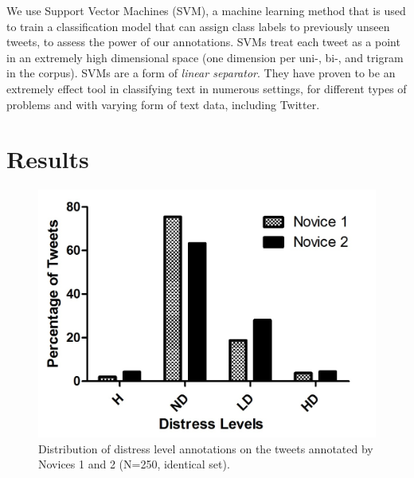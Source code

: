 \documentclass[11pt]{article}
\begin{document}
We use Support Vector Machines (SVM), a machine learning method that is used to train a classification model that can assign class labels to previously unseen tweets, to assess the power of our annotations. SVMs treat each tweet as a point in an extremely high dimensional space (one dimension per uni-, bi-, and trigram in the corpus). SVMs are a form of \emph{linear separator}. They have proven to be an extremely effect tool in classifying text in numerous settings, for different types of problems and with varying form of text data, including Twitter. 


\section{Results}


\begin{figure}[h]
\centering
\includegraphics[scale=0.65]{ChrisCissi4cat.jpg}
\caption{Distribution of distress level annotations on the tweets annotated by Novices 1 and 2 (N=250, identical set).}
\label{fig:distress-distrib1}
\end{figure}
\end{document}
